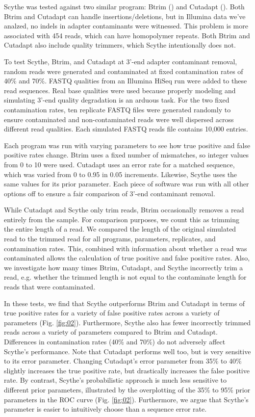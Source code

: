 \documentclass{bioinfo}
\begin{document}
\begin{methods}
Scythe was tested against two similar program: Btrim
(\citealp{pmid21651976}) and Cutadapt (\citealp{EJ200}). Both
Btrim and Cutadapt can handle insertions/deletions, but in Illumina
data we've analzed, no indels in adapter contaminants were
witnessed. This problem is more associated with 454 reads, which can
have homopolymer repeats. Both Btrim and Cutadapt also include quality
trimmers, which Scythe intentionally does not.

To test Scythe, Btrim, and Cutadapt at 3'-end adapter contaminant
removal, random reads were generated and contaminated at fixed
contamination rates of 40\% and 70\%. FASTQ qualities from an Illumina
HiSeq run were added to these read sequences. Real base qualities were
used because properly modeling and simulating 3'-end quality
degradation is an arduous task. For the two fixed contamination rates,
ten replicate FASTQ files were generated randomly to ensure
contaminated and non-contaminated reads were well dispersed across
different read qualities. Each simulated FASTQ reads file contains
10,000 entries.

Each program was run with varying parameters to see how true positive
and false positive rates change. Btrim uses a fixed number of
mismatches, so integer values from 0 to 10 were used. Cutadapt uses an
error rate for a matched sequence, which was varied from 0 to 0.95 in
0.05 increments. Likewise, Scythe uses the same values for its prior
parameter. Each piece of software was run with all other options off
to ensure a fair comparison of 3'-end contaminant removal.

While Cutadapt and Scythe only trim reads, Btrim occasionally removes
a read entirely from the sample. For comparison purposes, we count
this as trimming the entire length of a read. We compared the length
of the original simulated read to the trimmed read for all programs,
parameters, replicates, and contamination rates. This, combined with
information about whether a read was contaminated allows the
calculation of true positive and false positive rates. Also, we
investigate how many times Btrim, Cutadapt, and Scythe incorrectly
trim a read, e.g. whether the trimmed length is not equal to the
contaminate length for reads that were contaminated.

In these tests, we find that Scythe outperforms Btrim and Cutadapt in
terms of true positive rates for a variety of false positive rates
across a variety of parameters (Fig. \ref{fig:02}). Furthermore,
Scythe also has fewer incorrectly trimmed reads across a variety of
parameters compared to Btrim and Cutadapt. Differences in
contamination rates (40\% and 70\%) do not adversely affect Scythe's
performance. Note that Cutadapt performs well too, but is very
sensitive to its error parameter. Changing Cutadapt's error parameter
from 35\% to 40\% slightly increases the true positive rate, but
drastically increases the false positive rate. By contrast, Scythe's
probabilistic approach is much less sensitive to different prior
parameters, illustrated by the overplotting of the 35\% to 95\% prior
parameters in the ROC curve (Fig. \ref{fig:02}). Furthermore, we argue
that Scythe's parameter is easier to intuitively choose than a
sequence error rate.


\end{methods}
\end{document}

